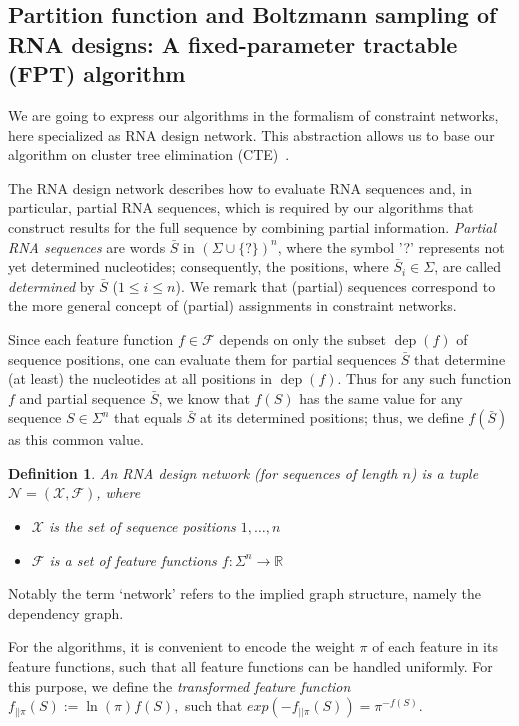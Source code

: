 \documentclass{bmcart}
\newtheorem{definition}[theorem]{Definition}
\newcommand{\network}{\mathcal{N}}
\newcommand{\val}{\bar S} %
\newcommand{\dep}{\operatorname{dep}}
\newcommand{\real}{\mathbb{R}}
\newcommand{\F}{\mathcal{F}}
\newcommand{\X}{\mathcal{X}}
\newcommand{\Def}[1]{\emph{#1}}
\newcommand{\evalfor}[2]{#1(#2)}
\newcommand{\citet}[1]{\cite{#1}}
\begin{document}
\subsection*{Partition function and Boltzmann sampling of RNA designs: A fixed-parameter tractable (FPT) algorithm}
\label{sec:FPT}

We are going to express our algorithms in the formalism of constraint networks, here
specialized as RNA design network. This abstraction allows us to base our
algorithm on cluster tree elimination (CTE)~\citet{Dechter2013}.

The RNA design network describes how to evaluate RNA sequences and, in
particular, partial RNA sequences, which is required by our algorithms
that construct results for the full sequence by combining partial
information.
%
\Def{Partial RNA sequences} are words $\val$ in
$(\Sigma\cup\{?\})^n$, where the symbol '?' represents not yet determined nucleotides; consequently, the positions, where $\val_i\in\Sigma$,
are called \Def{determined} by $\val$ ($1\leq i\leq n$).
%
We remark that (partial) sequences correspond to the more general concept of (partial) assignments in
constraint networks.

Since each feature function $f\in\F$
depends on only the subset $\dep(f)$ of sequence positions, one can
evaluate them for partial sequences $\val$ that determine (at least)
the nucleotides at all positions in $\dep(f)$. Thus for any such function $f$
and partial sequence $\val$, we know that $f(S)$ has the same value for any sequence $S\in \Sigma^n$ that equals $\val$ at its determined positions; thus, we define $\evalfor{f}{\val}$ as this common value.

\begin{definition}
An \Def{RNA design network} (for sequences of length $n$) is a tuple $\network=(\X,\F)$, where\vspace{-6pt}
\begin{itemize}
\item $\X$ is the set of sequence positions $1,\dots,n$
\item $\F$ is a set of \Def{feature functions} $f:\Sigma^n\to\real$
\end{itemize}
\end{definition}
%
Notably the term `network' refers to the implied graph structure, namely the dependency graph.

\newcommand{\weighttransform}[2]{{#1}_{||{#2}}}

For the algorithms, it is convenient to encode the weight $\pi$ of each feature in its feature functions, such that all feature functions can be handled uniformly. For this purpose, we define the \Def{transformed feature function} 
$\weighttransform{f}{\pi}(S) := \ln(\pi)f(S),$
such that $exp(-\weighttransform{f}{\pi}(S))=\pi^{-f(S)}.$ 
%
\end{document}
